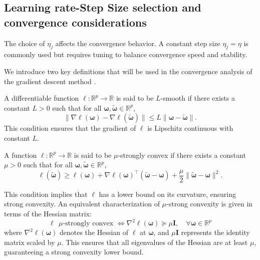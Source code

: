 \subsection*{Learning rate-Step Size selection and convergence considerations}

The choice of $ \eta_j $ affects the convergence behavior. A constant step size $ \eta_j = \eta $ is commonly used but requires tuning to balance convergence speed and stability.

We introduce two key definitions that will be used in the convergence analysis of the gradient descent method \cite{garrigos2023handbook}.

\begin{definition}
A differentiable function $\ell: \mathbb{R}^p \to \mathbb{R}$ is said to be $L$-smooth if there exists a constant $L > 0$ such that for all $\bm\omega, \bm{\tilde{\omega}} \in \mathbb{R}^p$,\\
\begin{equation} \label{eq:L_smoothness}
    \| \nabla \ell(\bm{\omega}) - \nabla \ell(\bm{\tilde{\omega}}) \| \leq L \| \bm{\omega} - \bm{\tilde{\omega}} \|.
\end{equation}
This condition ensures that the gradient of $\ell$ is Lipschitz continuous with constant $L$.
\end{definition}

\begin{definition}
A function $\ell: \mathbb{R}^p \to \mathbb{R}$ is said to be $\mu$-strongly convex if there exists a constant $\mu > 0$ such that for all $\bm\omega, \bm{\tilde{\omega}} \in \mathbb{R}^p$,\\
\begin{equation} \label{eq:mu_strong_convexity}
    \ell(\bm{\tilde{\omega}}) \geq \ell(\bm\omega) + \nabla \ell(\bm\omega)^{\top}(\bm{\tilde{\omega}} - \bm\omega) + \frac{\mu}{2} \| \bm{\tilde{\omega}} - \bm\omega \|^2.
\end{equation}
\end{definition}
This condition implies that $\ell$ has a lower bound on its curvature, ensuring strong convexity. An equivalent characterization of $\mu$-strong convexity is given in terms of the Hessian matrix:\\
\begin{equation} \label{eq:hessian_characterization}
    \ell ~~ \mu\text{-strongly convex~} \Leftrightarrow \nabla^2 \ell(\bm\omega) \succeq \mu \mathbf{I}, \quad \forall \bm\omega \in \mathbb{R}^p
\end{equation}
where $\nabla^2 \ell(\bm\omega)$ denotes the Hessian of $\ell$ at $\bm\omega$, and $\mu \mathbf{I}$ represents the identity matrix scaled by $\mu$. This ensures that all eigenvalues of the Hessian are at least $\mu$, guaranteeing a strong convexity lower bound.

